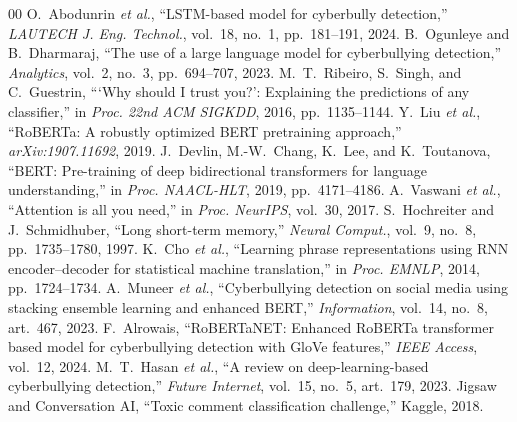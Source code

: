 \documentclass[conference]{IEEEtran}
\begin{document}
\begin{thebibliography}{00}
 O.~Abodunrin \emph{et al.}, ``LSTM-based model for cyberbully detection,'' \emph{LAUTECH J. Eng. Technol.}, vol.~18, no.~1, pp.~181--191, 2024.
 B.~Ogunleye and B.~Dharmaraj, ``The use of a large language model for cyberbullying detection,'' \emph{Analytics}, vol.~2, no.~3, pp.~694--707, 2023.
 M.~T.~Ribeiro, S.~Singh, and C.~Guestrin, ```Why should I trust you?': Explaining the predictions of any classifier,'' in \emph{Proc. 22nd ACM SIGKDD}, 2016, pp.~1135--1144.
 Y.~Liu \emph{et al.}, ``RoBERTa: A robustly optimized BERT pretraining approach,'' \emph{arXiv:1907.11692}, 2019.
 J.~Devlin, M.-W.~Chang, K.~Lee, and K.~Toutanova, ``BERT: Pre-training of deep bidirectional transformers for language understanding,'' in \emph{Proc. NAACL-HLT}, 2019, pp.~4171--4186.
 A.~Vaswani \emph{et al.}, ``Attention is all you need,'' in \emph{Proc. NeurIPS}, vol.~30, 2017.
 S.~Hochreiter and J.~Schmidhuber, ``Long short-term memory,'' \emph{Neural Comput.}, vol.~9, no.~8, pp.~1735--1780, 1997.
 K.~Cho \emph{et al.}, ``Learning phrase representations using RNN encoder--decoder for statistical machine translation,'' in \emph{Proc. EMNLP}, 2014, pp.~1724--1734.
 A.~Muneer \emph{et al.}, ``Cyberbullying detection on social media using stacking ensemble learning and enhanced BERT,'' \emph{Information}, vol.~14, no.~8, art.~467, 2023.
 F.~Alrowais, ``RoBERTaNET: Enhanced RoBERTa transformer based model for cyberbullying detection with GloVe features,'' \emph{IEEE Access}, vol.~12, 2024.
 M.~T.~Hasan \emph{et al.}, ``A review on deep-learning-based cyberbullying detection,'' \emph{Future Internet}, vol.~15, no.~5, art.~179, 2023.
 Jigsaw and Conversation AI, ``Toxic comment classification challenge,'' Kaggle, 2018.
\end{thebibliography}
\end{document}
